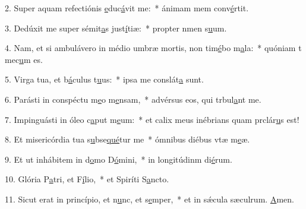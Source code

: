 2. Super aquam refectiónis \uline{e}duc\uline{á}vit me:~* ánimam mem conv\uline{é}rtit.\par 
3. Dedúxit me super sémit\uline{a}s just\uline{í}tiæ:~* propter nmen s\uline{u}um.\par 
4. Nam, et si ambulávero in médio umbræ mortis, non tim\uline{é}bo m\uline{a}la:~* quóniam t mec\uline{u}m es.\par 
5. Virga tua, et b\uline{á}culus t\uline{u}us:~* ipsa me conslát\uline{a} sunt.\par 
6. Parásti in conspéctu m\uline{e}o m\uline{e}nsam,~* advérsus eos, qui trbul\uline{a}nt me.\par 
7. Impinguásti in óleo c\uline{a}put m\uline{e}um:~* et calix meus inébrians quam prclár\uline{u}s est!\par 
8. Et misericórdia tua s\uline{u}bse\uline{qué}tur me~* ómnibus diébus vtæ m\uline{e}æ.\par 
9. Et ut inhábitem in d\uline{o}mo D\uline{ó}mini,~* in longitúdinm di\uline{é}rum.\par 
10. Glória P\uline{a}tri, et F\uline{í}lio,~* et Spiríti S\uline{a}ncto.\par 
11. Sicut erat in princípio, et n\uline{u}nc, et s\uline{e}mper,~* et in sǽcula sæculrum. \uline{A}men.\par 
